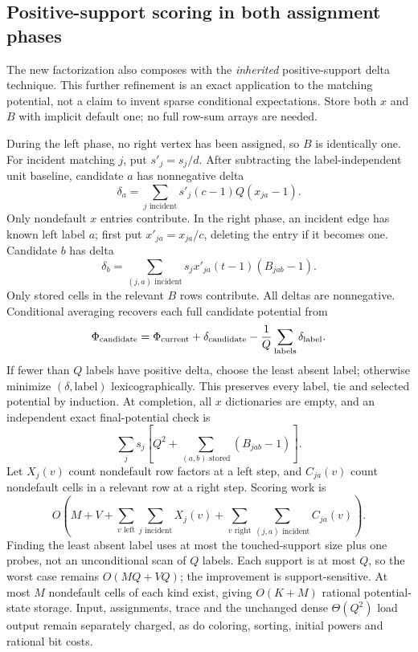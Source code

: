 \documentclass[11pt,letterpaper]{article}
\theoremstyle{remark}\newtheorem{remark}[theorem]{Remark}
\begin{document}
\subsection{Positive-support scoring in both assignment phases}
The new factorization also composes with the \emph{inherited} positive-support delta technique. This further refinement is an exact application to the matching potential, not a claim to invent sparse conditional expectations. Store both $x$ and $B$ with implicit default one; no full row-sum arrays are needed.

During the left phase, no right vertex has been assigned, so $B$ is identically one. For incident matching $j$, put $s'_j=s_j/d$. After subtracting the label-independent unit baseline, candidate $a$ has nonnegative delta
\[
 \delta_a=\sum_{j\text{ incident}}s'_j(c-1)Q(x_{ja}-1).
\]
Only nondefault $x$ entries contribute. In the right phase, an incident edge has known left label $a$; first put $x'_{ja}=x_{ja}/c$, deleting the entry if it becomes one. Candidate $b$ has delta
\[
 \delta_b=\sum_{(j,a)\text{ incident}}
                 s_jx'_{ja}(t-1)(B_{jab}-1).
\]
Only stored cells in the relevant $B$ rows contribute. All deltas are nonnegative. Conditional averaging recovers each full candidate potential from
\begin{equation}\label{eq:sparsedelta}
 \Phi_{\rm candidate}=\Phi_{\rm current}+\delta_{\rm candidate}
                         -\frac1Q\sum_{\rm labels}\delta_{\rm label}.
\end{equation}
If fewer than $Q$ labels have positive delta, choose the least absent label; otherwise minimize $(\delta,\mathrm{label})$ lexicographically. This preserves every label, tie and selected potential by induction. At completion, all $x$ dictionaries are empty, and an independent exact final-potential check is
\[
 \sum_js_j\left[Q^2+\sum_{(a,b)\text{ stored}}(B_{jab}-1)\right].
\]
Let $X_j(v)$ count nondefault row factors at a left step, and $C_{ja}(v)$ count nondefault cells in a relevant row at a right step. Scoring work is
\[
 O\!\left(M+V+
 \sum_{v\text{ left}}\sum_{j\text{ incident}}X_j(v)+
 \sum_{v\text{ right}}\sum_{(j,a)\text{ incident}}C_{ja}(v)\right).
\]
Finding the least absent label uses at most the touched-support size plus one probes, not an unconditional scan of $Q$ labels. Each support is at most $Q$, so the worst case remains $O(MQ+VQ)$; the improvement is support-sensitive. At most $M$ nondefault cells of each kind exist, giving $O(K+M)$ rational potential-state storage. Input, assignments, trace and the unchanged dense $\Theta(Q^2)$ load output remain separately charged, as do coloring, sorting, initial powers and rational bit costs.
\end{document}
